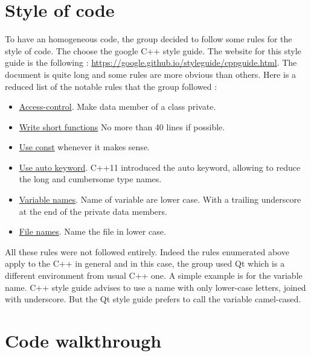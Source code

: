 \section{Style of code}
To have an homogeneous code, the group decided to follow some rules for the style of code. The choose the google C++ style guide. The website for this style guide is the following : \url{https://google.github.io/styleguide/cppguide.html}.
The document is quite long and some rules are more obvious than others. Here is a reduced list of the notable rules that the group followed :
\begin{itemize}
	\item \href{https://google.github.io/styleguide/cppguide.html#Access_Control}{Access-control}. Make data member of a class private. 
	\item \href{https://google.github.io/styleguide/cppguide.html#Write_Short_Functions}{Write short functions} No more than 40 lines if possible.
	\item \href{https://google.github.io/styleguide/cppguide.html#Use_of_const}{Use const} whenever it makes sense.
	\item \href{https://google.github.io/styleguide/cppguide.html#auto}{Use auto keyword}. C++11 introduced the auto keyword, allowing to reduce the long and cumbersome type names.
	\item \href{https://google.github.io/styleguide/cppguide.html#Variable_Names}{Variable names}. Name of variable are lower case. With a trailing underscore at the end of the private data members.
	\item \href{https://google.github.io/styleguide/cppguide.html#File_Names}{File names}. Name the file in lower case.
\end{itemize}
All these rules were not followed entirely. Indeed the rules enumerated above apply to the C++ in general and in this case, the group used Qt which is a different environment from usual C++ one. A simple example is for the variable name. C++ style guide advises to use a name with only lower-case letters, joined with underscore. But the Qt style guide prefers to call the variable camel-cased.

\section{Code walkthrough}


